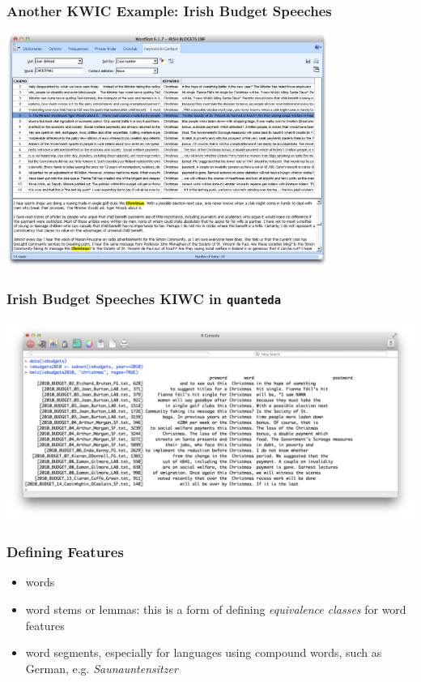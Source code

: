\documentclass[11pt,handout]{beamer}
\begin{document}
\begin{frame}
 \frametitle{Another KWIC Example: Irish Budget Speeches}
 \begin{center}
  \includegraphics[width=10.5cm]{KWICWordstat.png}
 \end{center}
\end{frame}

\begin{frame}
 \frametitle{Irish Budget Speeches KIWC in \texttt{quanteda}}
 \begin{center}
  \includegraphics[width=1.1\textwidth]{KWICquanteda.png}
 \end{center}
\end{frame}


\begin{frame}
 \frametitle{Defining Features}
 \begin{itemize}
  \item words
  \item \pause word stems or lemmas: this is a form of defining \emph{equivalence classes} for word features
  \item \pause word segments, especially for languages using compound words,
        such as German, e.g. \newline
        \pause
        \newline
         \newline
        \pause \emph{Saunauntensitzer}
 \end{itemize}
\end{frame}
\end{document}
